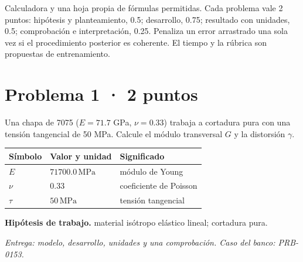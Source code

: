
Calculadora y una hoja propia de fórmulas permitidas. Cada problema vale 2 puntos: hipótesis y planteamiento, 0.5; desarrollo, 0.75; resultado con unidades, 0.5; comprobación e interpretación, 0.25. Penaliza un error arrastrado una sola vez si el procedimiento posterior es coherente. El tiempo y la rúbrica son propuestas de entrenamiento.

\par\medskip\noindent\begin{minipage}{\linewidth}

\section{Problema 1 · 2 puntos}

Una chapa de 7075 ($E = 71.7$ GPa, $\nu = 0.33$) trabaja a cortadura pura con una tensión tangencial de 50 MPa. Calcule el módulo transversal $G$ y la distorsión $\gamma$.

\par\medskip\noindent\begin{tabular}{@{}p{.18\linewidth}p{.26\linewidth}p{.48\linewidth}@{}}
\toprule Símbolo & Valor y unidad & Significado\\\midrule
$E$ & $71700.0\,\mathrm{MPa}$ & módulo de Young\\
$\nu$ & $0.33$ & coeficiente de Poisson\\
$\tau$ & $50\,\mathrm{MPa}$ & tensión tangencial\\
\bottomrule\end{tabular}\par\medskip



\par\textbf{Hipótesis de trabajo.} material isótropo elástico lineal; cortadura pura.

\par\textit{Entrega: modelo, desarrollo, unidades y una comprobación. Caso del banco: PRB-0153.}\end{minipage}\par\medskip

